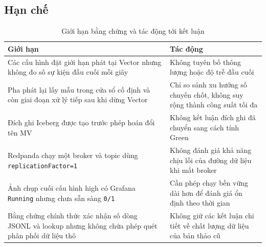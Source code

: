 \subsection{Hạn chế}\label{sec:limitations}
\begin{table}[H]
\centering
\caption{Giới hạn bằng chứng và tác động tới kết luận}
\begin{tabularx}{\textwidth}{@{}p{}Y@{}}
\toprule
\textbf{Giới hạn} & \textbf{Tác động}\\
\midrule
Các cấu hình đặt giới hạn phát tại Vector nhưng không đo số sự kiện đầu cuối mỗi giây & Không tuyên bố thông lượng hoặc độ trễ đầu cuối\\
Pha phát lại lấy mẫu trong cửa sổ cố định và còn giai đoạn xử lý tiếp sau khi dừng Vector & Chỉ so sánh xu hướng số chuyến chốt, không suy rộng thành công suất tối đa\\
Đích ghi Iceberg được tạo trước phép hoán đổi tên MV & Không kết luận đích ghi đã chuyển sang cách tính Green\\
Redpanda chạy một broker và topic dùng \texttt{replicationFactor=1} & Không đánh giá khả năng chịu lỗi của đường dữ liệu khi mất broker\\
Ảnh chụp cuối cấu hình high có Grafana \texttt{Running} nhưng chưa sẵn sàng \texttt{0/1} & Cần phép chạy bền vững dài hơn để đánh giá ổn định theo thời gian\\
Bằng chứng chính thức xác nhận số dòng JSONL và lookup nhưng không chứa phép quét phân phối dữ liệu thô & Không giữ các kết luận chi tiết về chất lượng dữ liệu của bản thảo cũ\\
\bottomrule
\end{tabularx}
\end{table}
